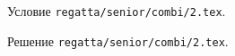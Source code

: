 Условие \texttt{regatta/senior/combi/2.tex}.

\solution Решение \texttt{regatta/senior/combi/2.tex}.

